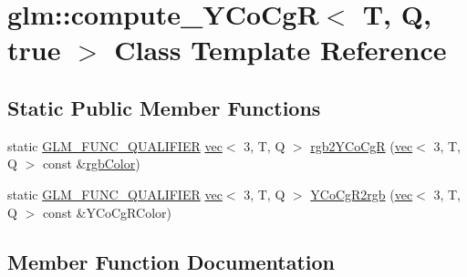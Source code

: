 \hypertarget{classglm_1_1compute___y_co_cg_r_3_01_t_00_01_q_00_01true_01_4}{}\section{glm\+:\+:compute\+\_\+\+Y\+Co\+CgR$<$ T, Q, true $>$ Class Template Reference}
\label{classglm_1_1compute___y_co_cg_r_3_01_t_00_01_q_00_01true_01_4}
\subsection*{Static Public Member Functions}
\begin{DoxyCompactItemize}
\item 
static \hyperlink{setup_8hpp_a33fdea6f91c5f834105f7415e2a64407}{G\+L\+M\+\_\+\+F\+U\+N\+C\+\_\+\+Q\+U\+A\+L\+I\+F\+I\+ER} \hyperlink{structglm_1_1vec}{vec}$<$ 3, T, Q $>$ \hyperlink{classglm_1_1compute___y_co_cg_r_3_01_t_00_01_q_00_01true_01_4_a1cf1c142223066bbf63e906c7f426bc4}{rgb2\+Y\+Co\+CgR} (\hyperlink{structglm_1_1vec}{vec}$<$ 3, T, Q $>$ const \&\hyperlink{group__gtx__color__space_ga5f9193be46f45f0655c05a0cdca006db}{rgb\+Color})
\item 
static \hyperlink{setup_8hpp_a33fdea6f91c5f834105f7415e2a64407}{G\+L\+M\+\_\+\+F\+U\+N\+C\+\_\+\+Q\+U\+A\+L\+I\+F\+I\+ER} \hyperlink{structglm_1_1vec}{vec}$<$ 3, T, Q $>$ \hyperlink{classglm_1_1compute___y_co_cg_r_3_01_t_00_01_q_00_01true_01_4_aa5c06979ab1f4762a3d4528d55e9655d}{Y\+Co\+Cg\+R2rgb} (\hyperlink{structglm_1_1vec}{vec}$<$ 3, T, Q $>$ const \&Y\+Co\+Cg\+R\+Color)
\end{DoxyCompactItemize}


\subsection{Member Function Documentation}
\mbox{\label{classglm_1_1compute___y_co_cg_r_3_01_t_00_01_q_00_01true_01_4_a1cf1c142223066bbf63e906c7f426bc4}} 
